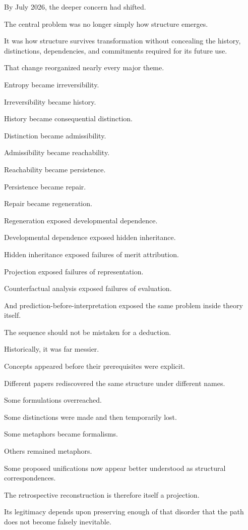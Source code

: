 \documentclass[11pt]{article}
\theoremstyle{remark}
\begin{document}
By July 2026, the deeper concern had shifted.

The central problem was no longer simply how structure emerges.

It was how structure survives transformation without concealing the history,
distinctions, dependencies, and commitments required for its future use.

That change reorganized nearly every major theme.

Entropy became irreversibility.

Irreversibility became history.

History became consequential distinction.

Distinction became admissibility.

Admissibility became reachability.

Reachability became persistence.

Persistence became repair.

Repair became regeneration.

Regeneration exposed developmental dependence.

Developmental dependence exposed hidden inheritance.

Hidden inheritance exposed failures of merit attribution.

Projection exposed failures of representation.

Counterfactual analysis exposed failures of evaluation.

And prediction-before-interpretation exposed the same problem inside theory
itself.

The sequence should not be mistaken for a deduction.

Historically, it was far messier.

Concepts appeared before their prerequisites were explicit.

Different papers rediscovered the same structure under different names.

Some formulations overreached.

Some distinctions were made and then temporarily lost.

Some metaphors became formalisms.

Others remained metaphors.

Some proposed unifications now appear better understood as structural
correspondences.

The retrospective reconstruction is therefore itself a projection.

Its legitimacy depends upon preserving enough of that disorder that the path
does not become falsely inevitable.
\end{document}
